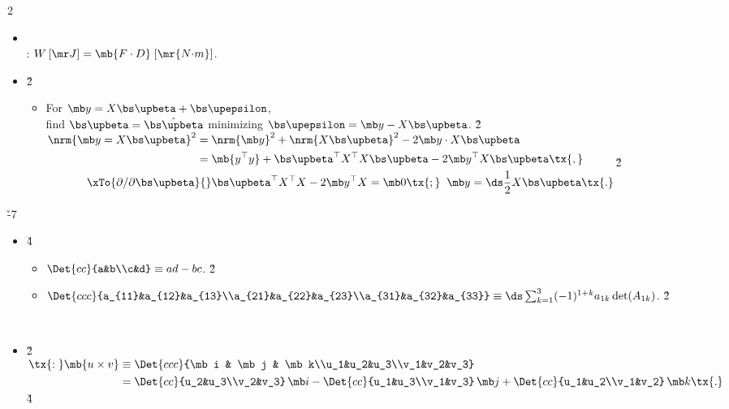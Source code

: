 \documentclass[dvipdfmx,a4paper,titlepage,9pt]{jsarticle}
\begin{document}
\begin{multicols*}{2}
\begin{itemize}[label={-}]
\item{}\\
: $W\,[\mr J]=\mb{F\cdot D}\;[\mr{N{\cdot}m}]$. \\

\item{}\v2
\begin{itemize}
\item[:] For $\mb y=X\bs\upbeta+\bs\upepsilon$,\\
         find $\bs\upbeta=\hat{\bs\upbeta}$ minimizing $\bs\upepsilon=\mb y-X\bs\upbeta$. \v2\\
         $\begin{aligned}
          \nrm{\mb y=X\bs\upbeta}^2={}&\nrm{\mb y}^2+\nrm{X\bs\upbeta}^2-2\mb y\cdot X\bs\upbeta \\
                                   ={}&\mb{y^\top y}+\bs\upbeta^\top X^\top X\bs\upbeta-2\mb y^\top X\bs\upbeta\tx{,} \\
\xTo{\partial/\partial\bs\upbeta}{}&\bs\upbeta^\top X^\top X-2\mb y^\top X=\mb 0\tx{;}\;\;\mb y=\ds\frac12X\bs\upbeta\tx{.}
          \end{aligned}$\v2\\
\end{itemize}
\end{itemize}

\v{-7}
\begin{itemize}[label={-}]
\item{}\v4
\begin{itemize}[label=\Cdot]
\setlength{\leftskip}{-5pt}
\item $\Det{cc}{a&b\\c&d}\equiv ad-bc$. \v2
\item $\Det{ccc}{a_{11}&a_{12}&a_{13}\\a_{21}&a_{22}&a_{23}\\a_{31}&a_{32}&a_{33}}\equiv\ds\sum_{k=1}^3(-1)^{1+k}a_{1k}\det(A_{1k})$. \v2
\end{itemize}
\;\;\\

\item{} \v2\\
$\begin{aligned}
 \tx{:\;}\mb{u\times v}&\equiv\Det{ccc}{\mb i & \mb j & \mb k\\u_1&u_2&u_3\\v_1&v_2&v_3} \\
                       &=\Det{cc}{u_2&u_3\\v_2&v_3}\,\mb i-\Det{cc}{u_1&u_3\\v_1&v_3}\,\mb j+\Det{cc}{u_1&u_2\\v_1&v_2}\,\mb k\tx{.}
 \end{aligned}$ \v4\\
 

\end{itemize}
\end{multicols*}
\end{document}
